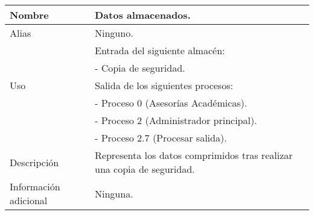 \begin{center}
  \begin{tabular}{| l | p{9cm} |}
    \hline
    Nombre & \textbf{Datos almacenados}.\\
    \hline
    Alias & Ninguno.\\
    \hline
    \multirow{5}{*}{Uso} & Entrada del siguiente almacén:\\
                         & - Copia de seguridad.\\
                         & Salida de los siguientes procesos:\\
                         & - Proceso 0 (Asesorías Académicas).\\
                         & - Proceso 2 (Administrador principal).\\
                         & - Proceso 2.7 (Procesar salida).\\
    \hline
    Descripción & Representa los datos comprimidos tras realizar una copia de
                  seguridad.\\
    \hline
    Información adicional & Ninguna.\\
    \hline
  \end{tabular}
\end{center}
